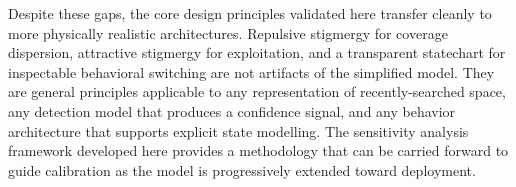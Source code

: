 \documentclass[10pt,a4paper,twocolumn]{article}
\begin{document}
Despite these gaps, the core design principles validated here transfer cleanly to more physically realistic architectures. Repulsive stigmergy for coverage dispersion, attractive stigmergy for exploitation, and a transparent statechart for inspectable behavioral switching are not artifacts of the simplified model. They are general principles applicable to any representation of recently-searched space, any detection model that produces a confidence signal, and any behavior architecture that supports explicit state modelling. The sensitivity analysis framework developed here provides a methodology that can be carried forward to guide calibration as the model is progressively extended toward deployment.

\balance

\end{document}
